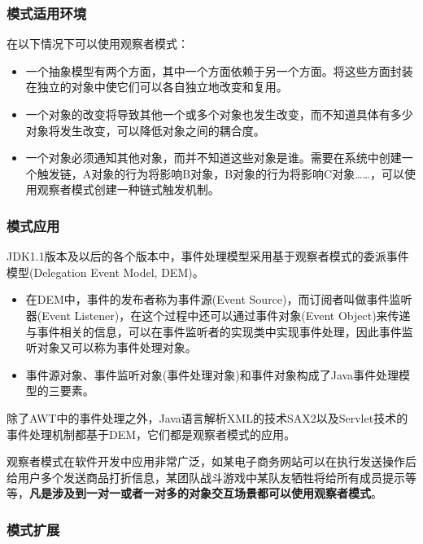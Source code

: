 \subsubsection{模式适用环境}
在以下情况下可以使用观察者模式：
\begin{itemize}
    \item 一个抽象模型有两个方面，其中一个方面依赖于另一个方面。将这些方面封装在独立的对象中使它们可以各自独立地改变和复用。
    \item 一个对象的改变将导致其他一个或多个对象也发生改变，而不知道具体有多少对象将发生改变，可以降低对象之间的耦合度。
    \item 一个对象必须通知其他对象，而并不知道这些对象是谁。需要在系统中创建一个触发链，A对象的行为将影响B对象，B对象的行为将影响C对象……，可以使用观察者模式创建一种链式触发机制。
\end{itemize}

\subsubsection{模式应用}
 JDK1.1版本及以后的各个版本中，事件处理模型采用基于观察者模式的委派事件模型(Delegation Event Model, DEM)。
\begin{itemize}
    \item 在DEM中，事件的发布者称为事件源(Event Source)，而订阅者叫做事件监听器(Event Listener)，在这个过程中还可以通过事件对象(Event Object)来传递与事件相关的信息，可以在事件监听者的实现类中实现事件处理，因此事件监听对象又可以称为事件处理对象。
    \item 事件源对象、事件监听对象(事件处理对象)和事件对象构成了Java事件处理模型的三要素。
\end{itemize}

 除了AWT中的事件处理之外，Java语言解析XML的技术SAX2以及Servlet技术的事件处理机制都基于DEM，它们都是观察者模式的应用。

 观察者模式在软件开发中应用非常广泛，如某电子商务网站可以在执行发送操作后给用户多个发送商品打折信息，某团队战斗游戏中某队友牺牲将给所有成员提示等等，\textbf{凡是涉及到一对一或者一对多的对象交互场景都可以使用观察者模式}。

\subsubsection{模式扩展}
